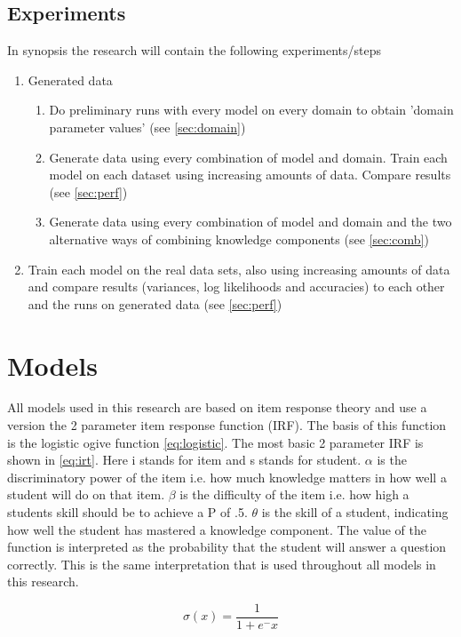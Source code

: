 \documentclass{scrartcl}
\begin{document}
\subsection{Experiments}
In synopsis the research will contain the following experiments/steps
\begin{enumerate}
\item Generated data
\begin{enumerate}
\item Do preliminary runs with every model on every domain to obtain 'domain parameter values' (see \ref{sec:domain})
\item Generate data using every combination of model and domain. Train each model on each dataset using increasing amounts of data. Compare results (see \ref{sec:perf})
\item Generate data using every combination of model and domain and the two alternative ways of combining knowledge components (see \ref{sec:comb})
\end{enumerate}
\item Train each model on the real data sets, also using increasing amounts of data and compare results (variances, log likelihoods and accuracies) to each other and the runs on generated data (see \ref{sec:perf})
\end{enumerate}


\section{Models}
All models used in this research are based on item response theory and use a version the 2 parameter item response function (IRF). The basis of this function is the logistic ogive function \ref{eq:logistic}. The most basic 2 parameter IRF is shown in \ref{eq:irt}. Here i stands for item and s stands for student. $\alpha$ is the discriminatory power of the item i.e. how much knowledge matters in how well a student will do on that item. $\beta$ is the difficulty of the item i.e. how high a students skill should be to achieve a P of .5. $\theta$ is the skill of a student, indicating how well the student has mastered a knowledge component. The value of the function is interpreted as the probability that the student will answer a question correctly. This is the same interpretation that is used throughout all models in this research.

\begin{equation}
\label{eq:logistic}
\sigma(x) = \frac{1}{1+e^-x}
\end{equation}
\end{document}
